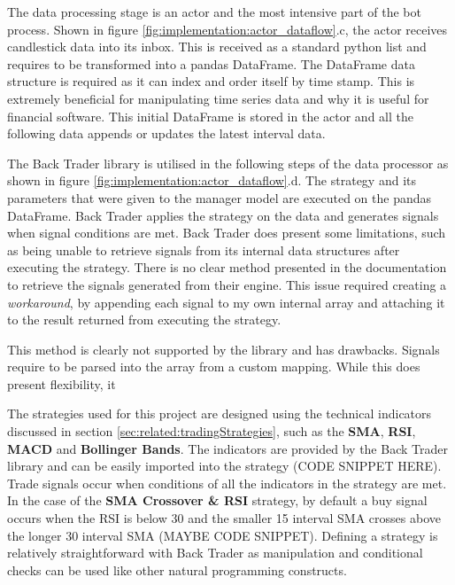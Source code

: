 The data processing stage is an actor and the most intensive part of the bot process. Shown in figure \ref{fig:implementation:actor_dataflow}.c, the actor receives candlestick data into its inbox. This is received as a standard python list and requires to be transformed into a pandas DataFrame. The DataFrame data structure is required as it can index and order itself by time stamp. This is extremely beneficial for manipulating time series data and why it is useful for financial software. This initial DataFrame is stored in the actor and all the following data appends or updates the latest interval data. 

The Back Trader library is utilised in the following steps of the data processor as shown in figure \ref{fig:implementation:actor_dataflow}.d. The strategy and its parameters that were given to the manager model are executed on the pandas DataFrame. Back Trader applies the strategy on the data and generates signals when signal conditions are met. Back Trader does present some limitations, such as being unable to retrieve signals from its internal data structures after executing the strategy. There is no clear method presented in the documentation to retrieve the signals generated from their engine. This issue required creating a \textit{workaround}, by appending each signal to my own internal array and attaching it to the result returned from executing the strategy.
 
This method is clearly not supported by the library and has drawbacks. Signals require to be parsed into the array from a custom mapping. While this does present flexibility, it

The strategies used for this project are designed using the technical indicators discussed in section \ref{sec:related:tradingStrategies}, such as the \textbf{SMA}, \textbf{RSI}, \textbf{MACD} and \textbf{Bollinger Bands}. The indicators are provided by the Back Trader library and can be easily imported into the strategy (CODE SNIPPET HERE). Trade signals occur when conditions of all the indicators in the strategy are met. In the case of the \textbf{SMA Crossover \& RSI} strategy, by default a buy signal occurs when the RSI is below 30 and the smaller 15 interval SMA crosses above the longer 30 interval SMA (MAYBE CODE SNIPPET). Defining a strategy is relatively straightforward with Back Trader as manipulation and conditional checks can be used like other natural programming constructs.

